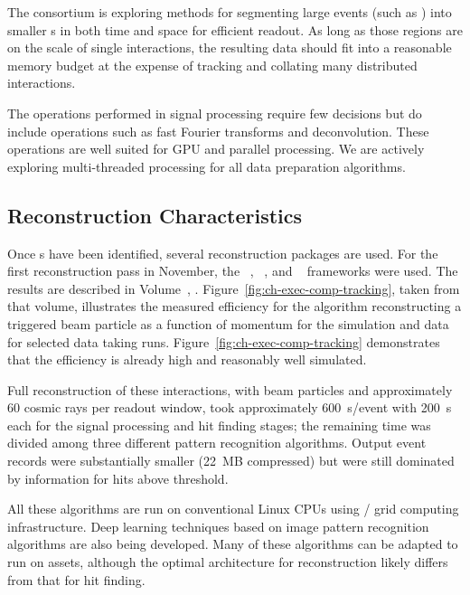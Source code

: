 The  consortium is exploring methods for segmenting large events (such as ) into  smaller s in both time and space for efficient readout.  As long as those regions are on the scale of single interactions, the resulting data should fit into a reasonable memory budget at the expense of tracking and collating many distributed interactions. 

The operations performed in signal processing require few decisions but do include operations such as fast Fourier transforms and deconvolution.  These operations are well suited for GPU and parallel processing. We are actively exploring multi-threaded processing for all data preparation algorithms. 


\subsection{Reconstruction Characteristics}

Once s have been identified, several \threed  reconstruction packages are used. For the first reconstruction pass in November, the  ~\cite{Acciarri:2017hat}, ~\cite{wirecell}, and ~\cite{ref:PMA}  frameworks were used. The results are described in Volume~\volnumberphysics{}, \voltitlephysics{}. 
Figure~\ref{fig:ch-exec-comp-tracking}, taken from that volume, illustrates the measured efficiency for the  algorithm reconstructing a triggered beam particle as a function of momentum for the simulation and data for selected data taking runs. Figure~\ref{fig:ch-exec-comp-tracking} demonstrates that the efficiency is already high and reasonably well simulated.

Full reconstruction of these  interactions, with beam particles and approximately 60 cosmic rays per readout window, took  approximately \SI{600}{s/event} with \SI{200}{s} each for the signal processing and hit finding stages; the remaining time was divided among three different pattern recognition algorithms. Output event records were substantially smaller (\SI{22}{MB} compressed) but were still dominated by information for  hits above threshold. 

All these algorithms are run on conventional %
Linux CPUs using / grid computing  infrastructure. Deep learning techniques based on image pattern recognition algorithms are also being developed. Many of these algorithms can be adapted to run on  assets, although the optimal architecture for \threed reconstruction likely differs from that for hit finding.

